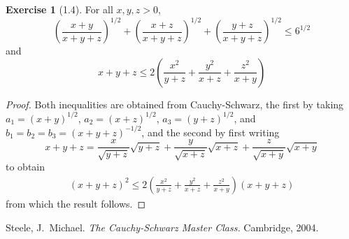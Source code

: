 \documentclass[letterpaper,12pt]{article}
\newcommand{\CS}{Cauchy-Schwarz}
\theoremstyle{definition}
\newtheorem*{exer}{Exercise}
\theoremstyle{remark}
\begin{document}
\begin{exer}[1.4]
For all \(x,y,z>0\),
\[\left(\frac{x+y}{x+y+z}\right)^{1/2}+\left(\frac{x+z}{x+y+z}\right)^{1/2}+\left(\frac{y+z}{x+y+z}\right)^{1/2}\le 6^{1/2}\tag{a}\]
and
\[x+y+z\le 2\left(\frac{x^2}{y+z}+\frac{y^2}{x+z}+\frac{z^2}{x+y}\right)\tag{b}\]
\end{exer}
\begin{proof}
Both inequalities are obtained from \CS, the first by taking \(a_1=(x+y)^{1/2}\), \(a_2=(x+z)^{1/2}\), \(a_3=(y+z)^{1/2}\), and \(b_1=b_2=b_3=(x+y+z)^{-1/2}\), and the second by first writing
\[x+y+z=\frac{x}{\sqrt{y+z}}\sqrt{y+z}+\frac{y}{\sqrt{x+z}}\sqrt{x+z}+\frac{z}{\sqrt{x+y}}\sqrt{x+y}\]
to obtain
\begin{align*}
(x+y+z)^2\le2\left(\frac{x^2}{y+z}+\frac{y^2}{x+z}+\frac{z^2}{x+y}\right)(x+y+z)
\end{align*}
from which the result follows.
\end{proof}

\begin{thebibliography}{0}
 Steele, J.~Michael. \textit{The Cauchy-Schwarz Master Class.} Cambridge, 2004.
\end{thebibliography}
\end{document}
